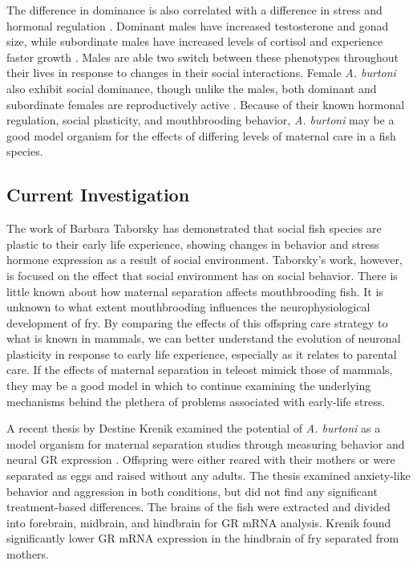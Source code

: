 \documentclass[12pt,twoside]{reedthesis}
\begin{document}
The difference in dominance is also correlated with a difference in stress and
hormonal regulation \citep{renn_fish_2008}. Dominant males have increased testosterone and gonad
size, while subordinate males have increased levels of
cortisol and experience faster growth \citep{francis_social_1993, renn_fish_2008}. Males are
able two switch between these phenotypes throughout their lives in response to
changes in their social interactions. Female \textit{A. burtoni} also exhibit social dominance, though unlike the
males, both dominant and subordinate females are reproductively active
\citep{renn_females_2012}. Because of their known hormonal regulation, social plasticity, and mouthbrooding
behavior, \textit{A. burtoni} may be a good model organism for the effects of
differing levels of maternal care in a fish species.
 
\subsection{Current Investigation}
 
The work of Barbara Taborsky has demonstrated that social fish species are
plastic to their early life experience, showing changes in behavior and stress
hormone expression as a result of social environment. Taborsky's work, however, is focused on the effect that social
environment has on social behavior. There is little known about how maternal
separation affects mouthbrooding fish. It is unknown to what extent
mouthbrooding influences the neurophysiological development of fry. By comparing
the effects of this offspring care strategy to what is known in mammals, we can
better understand the evolution of neuronal plasticity in response to early life
experience, especially as it relates to parental care. If the effects of
maternal separation in teleost mimick those of mammals, they may be a good model
in which to continue examining the underlying mechanisms behind the plethera of
problems associated with early-life stress.

A recent thesis by Destine Krenik examined the potential of \textit{A. burtoni}
as a model organism for maternal separation studies through measuring behavior and neural GR
expression \citep{KrenikDestine2018Teom}. Offspring were either reared with their mothers or were separated as
eggs and raised without any adults. The thesis examined anxiety-like behavior and aggression in both
conditions, but did not find any significant treatment-based differences. The
brains of the fish were extracted and divided into forebrain, midbrain, and hindbrain for
GR mRNA analysis. Krenik found significantly lower GR mRNA expression in
the hindbrain of fry separated from mothers.
\end{document}
